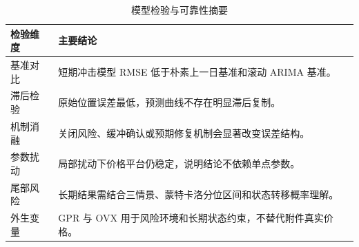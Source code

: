 \begin{table}[!htbp]
\centering
\caption{模型检验与可靠性摘要}
\begin{tabularx}{\linewidth}{lX}
\toprule
检验维度 & 主要结论 \\
\midrule
基准对比 & 短期冲击模型 RMSE 低于朴素上一日基准和滚动 ARIMA 基准。 \\
滞后检验 & 原始位置误差最低，预测曲线不存在明显滞后复制。 \\
机制消融 & 关闭风险、缓冲确认或预期修复机制会显著改变误差结构。 \\
参数扰动 & 局部扰动下价格平台仍稳定，说明结论不依赖单点参数。 \\
尾部风险 & 长期结果需结合三情景、蒙特卡洛分位区间和状态转移概率理解。 \\
外生变量 & GPR 与 OVX 用于风险环境和长期状态约束，不替代附件真实价格。 \\
\bottomrule
\end{tabularx}
\end{table}

